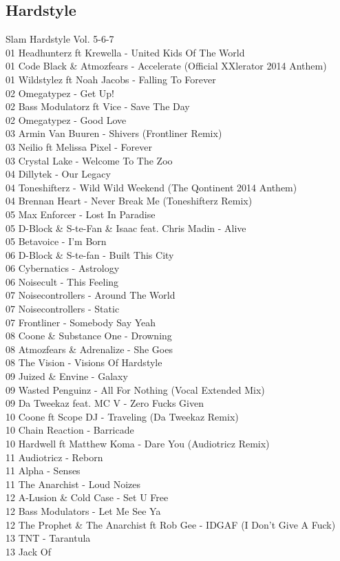 \begin{multicols}{2}
 \subsection*{Hardstyle}
 \large Slam Hardstyle Vol. 5-6-7 \normalsize\\
 01 Headhunterz ft Krewella - United Kids Of The World\\ 01 Code Black \& Atmozfears - Accelerate (Official XXlerator 2014 Anthem)\\ 01 Wildstylez ft Noah Jacobs - Falling To Forever\\ 02 Omegatypez - Get Up!\\ 02 Bass Modulatorz ft Vice - Save The Day\\ 02 Omegatypez - Good Love\\ 03 Armin Van Buuren - Shivers (Frontliner Remix)\\ 03 Neilio ft Melissa Pixel - Forever\\ 03 Crystal Lake - Welcome To The Zoo\\ 04 Dillytek - Our Legacy\\ 04 Toneshifterz - Wild Wild Weekend (The Qontinent 2014 Anthem)\\ 04 Brennan Heart - Never Break Me (Toneshifterz Remix)\\ 05 Max Enforcer - Lost In Paradise\\ 05 D-Block \& S-te-Fan \& Isaac feat. Chris Madin - Alive\\ 05 Betavoice - I'm Born\\ 06 D-Block \& S-te-fan - Built This City\\ 06 Cybernatics - Astrology\\ 06 Noisecult - This Feeling\\ 07 Noisecontrollers - Around The World\\ 07 Noisecontrollers - Static\\ 07 Frontliner - Somebody Say Yeah\\ 08 Coone \& Substance One - Drowning\\ 08 Atmozfears \& Adrenalize - She Goes\\ 08 The Vision - Visions Of Hardstyle\\ 09 Juized \& Envine - Galaxy\\ 09 Wasted Penguinz - All For Nothing (Vocal Extended Mix)\\ 09 Da Tweekaz feat. MC V - Zero Fucks Given\\ 10 Coone ft Scope DJ - Traveling (Da Tweekaz Remix)\\ 10 Chain Reaction - Barricade\\ 10 Hardwell ft Matthew Koma - Dare You (Audiotricz Remix)\\ 11 Audiotricz - Reborn\\ 11 Alpha - Senses\\ 11 The Anarchist - Loud Noizes\\ 12 A-Lusion \& Cold Case - Set U Free\\ 12 Bass Modulators - Let Me See Ya\\ 12 The Prophet \& The Anarchist ft Rob Gee - IDGAF (I Don't Give A Fuck)\\ 13 TNT - Tarantula\\ 13 Jack Of 
\end{multicols}
